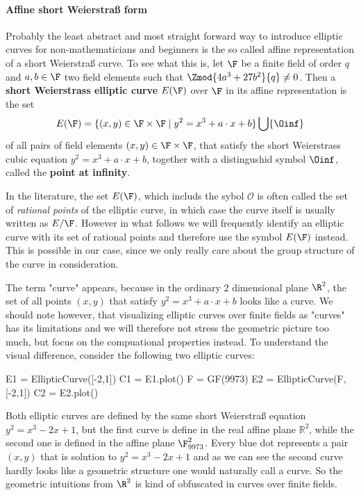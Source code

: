 \paragraph{Affine short Weierstraß form} Probably the least abstract and most straight forward way to introduce elliptic curves for non-mathematicians and beginners is the so called affine representation of a short Weierstraß curve. To see what this is, let $\F$ be a finite field of order $q$ and $a,b\in \F$ two field elements such that $\Zmod{4a^3+ 27b^2}{q}\neq 0$. Then a \textbf{short Weierstrass elliptic curve} $E(\F)$ over $\F$ in its affine representation is the set
\begin{equation}
\label{def_short_weierstrass_curve}
E(\F) = \{(x,y)\in \F\times \F\;|\; y^2=x^3+a\cdot x+b \} \bigcup \{\Oinf\}
\end{equation}
of all pairs of field elements $(x,y)\in \F\times \F$, that satisfy the short Weierstrass cubic equation $y^2=x^3+a\cdot x+b$, together with a distingushid symbol $\Oinf$, called the \textbf{point at infinity}.
\begin{notation}
In the literature, the set $E(\F)$, which includs the sybol $\mathcal{O}$ is often called the set of \textit{rational points} of the elliptic curve, in which case the curve itself is usually written as $E/\F$. However in what follows we will frequently identify an elliptic curve with its set of rational points and therefore use the symbol $E(\F)$ instead. This is possible in our case, since we only really care about the group structure of the curve in consideration.
\end{notation}
The term "curve" appears, because in the ordinary 2 dimensional plane $\R^2$,
the set of all points $(x,y)$ that satisfy $y^2 = x^3 +a\cdot x +b$ looks like a curve. We should note however, that visualizing elliptic curves over finite fields as "curves" has its limitations and we will therefore not stress the geometric picture too much, but focus on the compuational properties instead. To understand the visual difference, consider the following two elliptic curves: 
\begin{sagesilent}
E1 = EllipticCurve([-2,1])
C1 = E1.plot()
F = GF(9973)
E2 = EllipticCurve(F, [-2,1])
C2 = E2.plot()
\end{sagesilent}
\begin{center} 
\end{center}
Both elliptic curves are defined by the same short Weierstraß equation $y^2 = x^3-2x+1$, but the first curve is define in the real affine plane $\mathbb{R}^2$, while the second one is defined in the affine plane $\F_{9973}^2$. Every blue dot represents a pair $(x,y)$ that is solution to $y^2 = x^3-2x+1$ and as we can see the second curve hardly looks like a geometric structure one would naturally call a curve. So the geometric intuitions from $\R^2$ is kind of obfuscated in curves over finite fields.


